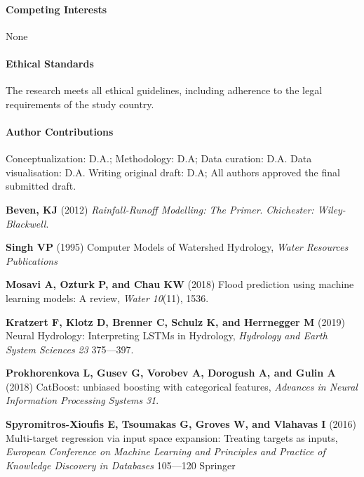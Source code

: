 \documentclass[ruler]{CUP-JNL-EDS}%
\begin{document}
\begin{Backmatter}


\paragraph{Competing Interests}
None

\paragraph{Ethical Standards}
The research meets all ethical guidelines, including adherence to the legal requirements of the study country.

\paragraph{Author Contributions}
Conceptualization: D.A.; Methodology: D.A; Data curation: D.A. Data visualisation: D.A. Writing original draft: D.A; All authors approved the final submitted draft.

\begin{thebibliography}{}

\textbf{Beven, KJ} (2012) \emph{Rainfall-Runoff Modelling: The Primer}. \textit{Chichester: Wiley-Blackwell}.

\textbf{Singh VP} (1995) Computer Models of Watershed Hydrology, \textit{Water Resources Publications}

\textbf{Mosavi A, Ozturk P, and Chau KW} (2018) Flood prediction using machine learning models: A review, \textit{Water} \textit{10}(11), {1536}.

\textbf{Kratzert F, Klotz D, Brenner C, Schulz K, and Herrnegger M} (2019) Neural Hydrology: Interpreting LSTMs in Hydrology, \textit{Hydrology and Earth System Sciences} \textit{23} {375}–--{397}.

\textbf{Prokhorenkova L, Gusev G, Vorobev A, Dorogush A, and Gulin A} (2018) CatBoost: unbiased boosting with categorical features, \textit{Advances in Neural Information Processing Systems} \textit{31}.

\textbf{Spyromitros-Xioufis E, Tsoumakas G, Groves W, and Vlahavas I} (2016) Multi-target regression via input space expansion: Treating targets as inputs, \textit{European Conference on Machine Learning and Principles and Practice of Knowledge Discovery in Databases} {105}--–{120} {Springer}


\end{thebibliography}
\end{Backmatter}
\end{document}
